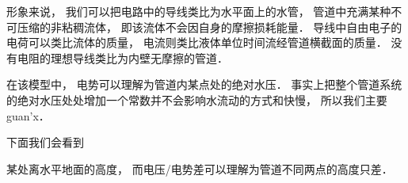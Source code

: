 


形象来说， 我们可以把电路中的导线类比为水平面上的水管， 管道中充满某种不可压缩的非粘稠流体， 即该流体不会因自身的摩擦损耗能量． 导线中自由电子的电荷可以类比流体的质量， 电流则类比液体单位时间流经管道横截面的质量． 没有电阻的理想导线类比为内壁无摩擦的管道．

在该模型中， 电势可以理解为管道内某点处的绝对水压． 事实上把整个管道系统的绝对水压处处增加一个常数并不会影响水流动的方式和快慢， 所以我们主要guan'x．

下面我们会看到

某处离水平地面的高度， 而电压/电势差可以理解为管道不同两点的高度只差．

